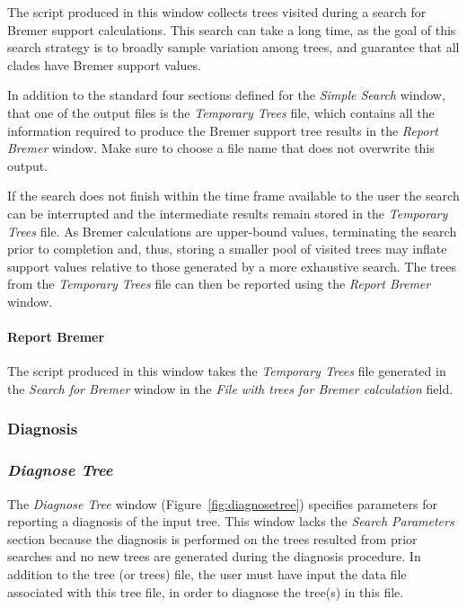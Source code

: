 {The script produced in this window collects trees visited during a search for 
Bremer support calculations. This search can take a long time, as the goal of 
this search strategy is to broadly sample variation among trees, and guarantee 
that all clades have Bremer support values.  

In addition to the standard four sections defined for the \emph{Simple Search} 
window, that one of the output files is the \emph{Temporary Trees} file, which 
contains all the information required to produce the Bremer support tree
results in the \emph{Report Bremer} window. Make sure to choose a file 
name that does not overwrite this output.

If the search does not finish within the time frame available to the user the search 
can be interrupted and the intermediate results remain stored in the \emph{Temporary 
Trees} file.  As Bremer calculations are upper-bound values, terminating the search 
prior to completion and, thus, storing a smaller pool of visited trees may inflate 
support values relative to those generated by a more exhaustive search. The trees 
from the \emph{Temporary Trees} file can then be reported using the 
\emph{Report Bremer} window.

\paragraph{Report Bremer}
The script produced in this window takes the \emph{Temporary Trees} file 
generated in the \emph{Search for Bremer} window in the \emph{File with 
trees for Bremer calculation} field. 

\subsubsection{Diagnosis}
\subsubsection*{\emph{Diagnose Tree}}

The \emph{Diagnose Tree} window (Figure~\ref{fig:diagnosetree}) specifies 
parameters for reporting a diagnosis of the input tree. This window lacks the 
\emph{Search Parameters} section because the diagnosis is performed on 
the trees resulted from prior searches and no new trees are generated during 
the diagnosis procedure. In addition to the tree (or trees) file, the user must have 
input the data file associated with this tree file, in order to diagnose
the tree(s) in this file.

}
